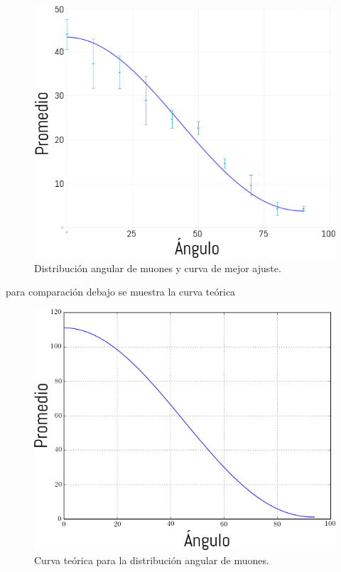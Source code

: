 \documentclass[a4paper,10pt]{article}
\numberwithin{equation}{section}
\begin{document}
\begin{figure}[H]
 \center 
 \includegraphics[scale=0.5]{ajusteAngulos}
 \caption{Distribución angular de muones y curva de mejor ajuste.}
 \label{fig:ajusteAngulos}
\end{figure}

para comparación debajo se muestra la curva teórica 

\begin{figure}[H]
 \center 
 \includegraphics[scale=0.5]{angulosTeorico}
 \caption{Curva teórica para la distribución angular de muones.}
 \label{fig:angulosTeorico}
\end{figure}
\end{document}
